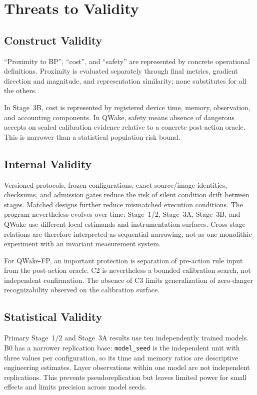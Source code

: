 \section{Threats to Validity}
\label{sec:discussion-validity-en}

\subsection{Construct Validity}

``Proximity to BP'', ``cost'', and ``safety'' are represented by concrete operational
definitions. Proximity is evaluated separately through final metrics, gradient
direction and magnitude, and representation similarity; none substitutes for all the
others.

In Stage~3B, cost is represented by registered device time, memory, observation, and
accounting components. In QWake, safety means absence of dangerous accepts on sealed
calibration evidence relative to a concrete post-action oracle. This is narrower than
a statistical population-risk bound.

\subsection{Internal Validity}

Versioned protocols, frozen configurations, exact source/image identities, checksums,
and admission gates reduce the risk of silent condition drift between stages. Matched
designs further reduce mismatched execution conditions. The program nevertheless
evolves over time: Stage~1/2, Stage~3A, Stage~3B, and QWake use different local
estimands and instrumentation surfaces. Cross-stage relations are therefore interpreted
as sequential narrowing, not as one monolithic experiment with an invariant measurement
system.

For QWake-FP, an important protection is separation of pre-action rule input from the
post-action oracle. C2 is nevertheless a bounded calibration search, not independent
confirmation. The absence of C3 limits generalization of zero-danger recognizability
observed on the calibration surface.

\subsection{Statistical Validity}

Primary Stage~1/2 and Stage~3A results use ten independently trained models. B0 has a
narrower replication base: \texttt{model\_seed} is the independent unit with three
values per configuration, so its time and memory ratios are descriptive engineering
estimates. Layer observations within one model are not independent replications. This
prevents pseudoreplication but leaves limited power for small effects and limits
precision across model seeds.

